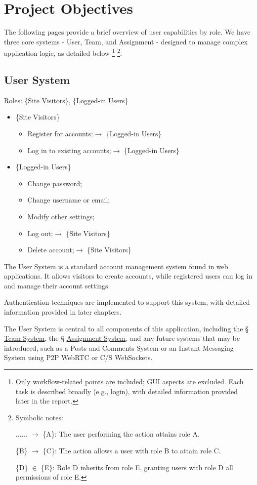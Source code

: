 \documentclass[12pt]{report}
\newcommand{\n}{\par}
\newcommand{\br}{\n\vspace{1 em}\n}
\begin{document}
\section{Project Objectives} \label{overview.project-objectives}
The following pages provide a brief overview of user capabilities by role.
We have three core systems - User, Team, and Assignment - designed to manage complex application logic, as detailed below
\footnote{Only workflow-related points are included; GUI aspects are excluded.
	Each task is described broadly (e.g., login), with detailed information provided later in the report.}
\footnote{Symbolic notes:\n
	...... $\rightarrow$ \{A\}: The user performing the action attains role A.\n
	\{B\} $\rightarrow$ \{C\}: The action allows a user with role B to attain role C.\n
	\{D\} $\in$ \{E\}: Role D inherits from role E, granting users with role D all permissions of role E.}.

\subsection{User System} \label{overview.project-objectives.user-system}
Roles: \{Site Visitors\}, \{Logged-in Users\}\n
\begin{itemize}
	\item \{Site Visitors\}
	      \begin{itemize}
		      \item Register for accounts;\null\hfill $\rightarrow$ \{Logged-in Users\}
		      \item Log in to existing accounts;\null\hfill $\rightarrow$ \{Logged-in Users\}
	      \end{itemize}
	\item \{Logged-in Users\}
	      \begin{itemize}
		      \item Change password;
		      \item Change username or email;
		      \item Modify other settings;
		      \item Log out;\null\hfill $\rightarrow$ \{Site Visitors\}
		      \item Delete account;\null\hfill $\rightarrow$ \{Site Visitors\}
	      \end{itemize}
\end{itemize}\n
The User System is a standard account management system found in web applications.
It allows visitors to create accounts, while registered users can log in and manage their account settings.
\br
Authentication techniques are implemented to support this system, with detailed information provided in later chapters.
\br
The User System is central to all components of this application,
including the \S{} \hyperref[overview.project-objectives.team-system]{Team System},
the \S{} \hyperref[overview.project-objectives.assignment-system]{Assignment System},
and any future systems that may be introduced,
such as a Posts and Comments System or an Instant Messaging System using P2P WebRTC or C/S WebSockets.
\end{document}

